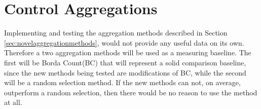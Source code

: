\section{Control Aggregations} 

Implementing and testing the aggregation methods described in Section \ref{sec:novelaggregationmethods}, would not provide any useful data on its own. Therefore a two aggregation methods will be used as a measuring baseline. The first will be Borda Count(BC) that will represent a solid comparison baseline, since the new methods being tested are modifications of BC, while the second will be a random selection method. If the new methods can not, on average, outperform a random selection, then there would be no reason to use the method at all.

